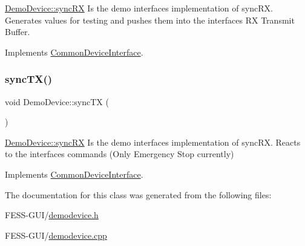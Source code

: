 \hyperlink{class_demo_device_a85671c408f6f08d82a09344ef5f34966}{Demo\+Device\+::sync\+RX} Is the demo interface\textquotesingle{}s implementation of sync\+RX. Generates values for testing and pushes them into the interface\textquotesingle{}s RX Transmit Buffer. 



Implements \hyperlink{class_common_device_interface_ac0166ca78cba5ae57a4803978af9e78c}{Common\+Device\+Interface}.

\hypertarget{class_demo_device_a4b33b0148627fcbd22a0704e80f05d7d}{}\label{class_demo_device_a4b33b0148627fcbd22a0704e80f05d7d} 
\subsubsection{\texorpdfstring{sync\+T\+X()}{syncTX()}}
{\footnotesize\ttfamily void Demo\+Device\+::sync\+TX (\begin{DoxyParamCaption}{ }\end{DoxyParamCaption})\hspace{0.3cm}{\ttfamily [virtual]}}



\hyperlink{class_demo_device_a85671c408f6f08d82a09344ef5f34966}{Demo\+Device\+::sync\+RX} Is the demo interface\textquotesingle{}s implementation of sync\+RX. Reacts to the interfaces commands (Only Emergency Stop currently) 



Implements \hyperlink{class_common_device_interface_acae4ab2226a4f1388b2af355ac2e4f86}{Common\+Device\+Interface}.



The documentation for this class was generated from the following files\+:\begin{DoxyCompactItemize}
\item 
F\+E\+S\+S-\/\+G\+U\+I/\hyperlink{demodevice_8h}{demodevice.\+h}\item 
F\+E\+S\+S-\/\+G\+U\+I/\hyperlink{demodevice_8cpp}{demodevice.\+cpp}\end{DoxyCompactItemize}
